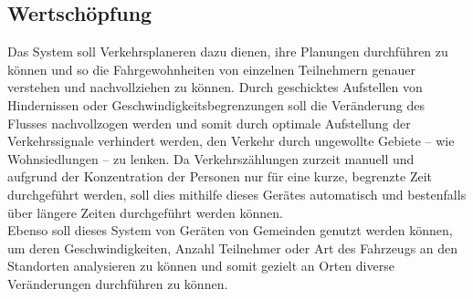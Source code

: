 \subsection{Wertschöpfung}
Das System soll Verkehrsplaneren dazu dienen, ihre Planungen durchführen zu können und so die Fahrgewohnheiten von einzelnen Teilnehmern genauer verstehen und nachvollziehen zu können. Durch geschicktes Aufstellen von Hindernissen oder Geschwindigkeitsbegrenzungen soll die Veränderung des Flusses nachvollzogen werden und somit durch optimale Aufstellung der Verkehrssignale verhindert werden, den Verkehr durch ungewollte Gebiete – wie Wohnsiedlungen – zu lenken. Da Verkehrszählungen zurzeit manuell und aufgrund der Konzentration der Personen nur für eine kurze, begrenzte Zeit durchgeführt werden, soll dies mithilfe dieses Gerätes automatisch und bestenfalls über längere Zeiten durchgeführt werden können.\\
Ebenso soll dieses System von Geräten von Gemeinden genutzt werden können, um deren Geschwindigkeiten, Anzahl Teilnehmer oder Art des Fahrzeugs an den Standorten analysieren zu können und somit gezielt an Orten diverse Veränderungen durchführen zu können. 